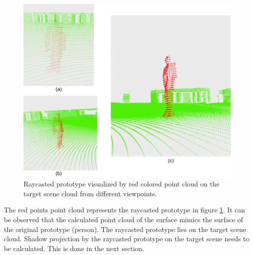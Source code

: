 \begin{figure}[htbp]
    \centering
    \includegraphics[width=1\linewidth]{97_graphics/results/raycasted_prototype.pdf}
    \caption{Raycasted prototype visualized by red colored point cloud on the target scene cloud from different viewpoints.}
    \label{fig:result-raycasted_prototype}
\end{figure}

The red points point cloud represents the raycasted prototype in figure \ref{fig:result-raycasted_prototype}. It can be observed that the calculated point cloud of the surface mimics the surface of the original prototype (person). The raycasted prototype lies on the target scene cloud. Shadow projection by the raycasted prototype on the target scene needs to be calculated. This is done in the next section.

